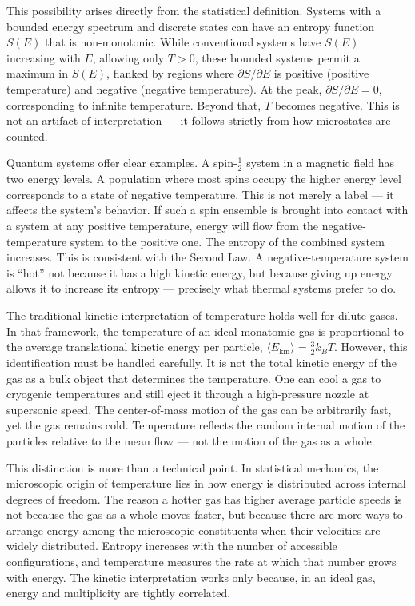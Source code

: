 This possibility arises directly from the statistical definition. Systems with a bounded energy spectrum and discrete states can have an entropy function $ S(E) $ that is non-monotonic. While conventional systems have $ S(E) $ increasing with $ E $, allowing only $ T > 0 $, these bounded systems permit a maximum in $ S(E) $, flanked by regions where $ \partial S/\partial E $ is positive (positive temperature) and negative (negative temperature). At the peak, $ \partial S/\partial E = 0 $, corresponding to infinite temperature. Beyond that, $ T $ becomes negative. This is not an artifact of interpretation — it follows strictly from how microstates are counted.

Quantum systems offer clear examples. A spin-$\tfrac{1}{2}$ system in a magnetic field has two energy levels. A population where most spins occupy the higher energy level corresponds to a state of negative temperature. This is not merely a label — it affects the system’s behavior. If such a spin ensemble is brought into contact with a system at any positive temperature, energy will flow from the negative-temperature system to the positive one. The entropy of the combined system increases. This is consistent with the Second Law. A negative-temperature system is “hot” not because it has a high kinetic energy, but because giving up energy allows it to increase its entropy — precisely what thermal systems prefer to do.

The traditional kinetic interpretation of temperature holds well for dilute gases. In that framework, the temperature of an ideal monatomic gas is proportional to the average translational kinetic energy per particle, $ \langle E_\text{kin} \rangle = \frac{3}{2}k_B T $. However, this identification must be handled carefully. It is not the total kinetic energy of the gas as a bulk object that determines the temperature. One can cool a gas to cryogenic temperatures and still eject it through a high-pressure nozzle at supersonic speed. The center-of-mass motion of the gas can be arbitrarily fast, yet the gas remains cold. Temperature reflects the random internal motion of the particles relative to the mean flow — not the motion of the gas as a whole.

This distinction is more than a technical point. In statistical mechanics, the microscopic origin of temperature lies in how energy is distributed across internal degrees of freedom. The reason a hotter gas has higher average particle speeds is not because the gas as a whole moves faster, but because there are more ways to arrange energy among the microscopic constituents when their velocities are widely distributed. Entropy increases with the number of accessible configurations, and temperature measures the rate at which that number grows with energy. The kinetic interpretation works only because, in an ideal gas, energy and multiplicity are tightly correlated.

